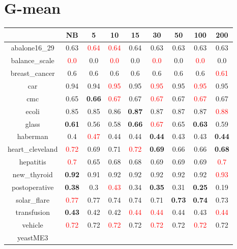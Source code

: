 \documentclass{article}%
\begin{document}
\section*{G{-}mean}%
\begin{tabular}{c|cccccccc}%
\hline%
&NB&5&10&15&30&50&100&200\\%
\hline%
abalone16\_29&0.63&\textcolor{red}{ 
0.64
}&\textcolor{red}{ 
0.64
}&0.64&0.63&0.63&0.63&0.63\\%
\hline%
balance\_scale&\textcolor{red}{ 
0.0
}&0.0&\textcolor{red}{ 
0.0
}&0.0&\textcolor{red}{ 
0.0
}&0.0&\textcolor{red}{ 
0.0
}&0.0\\%
\hline%
breast\_cancer&0.6&0.6&0.6&0.6&0.6&0.6&0.6&\textcolor{red}{ 
0.61
}\\%
\hline%
car&0.94&0.94&\textcolor{red}{ 
0.95
}&0.95&\textcolor{red}{ 
0.95
}&0.95&\textcolor{red}{ 
0.95
}&0.95\\%
\hline%
cmc&0.65&\textbf{0.66}&\textcolor{red}{ 
0.67
}&0.67&\textcolor{red}{ 
0.67
}&0.67&\textcolor{red}{ 
0.67
}&0.67\\%
\hline%
ecoli&0.85&0.85&0.86&\textbf{0.87}&0.87&0.87&0.87&\textcolor{red}{ 
0.88
}\\%
\hline%
glass&\textbf{0.61}&0.56&0.58&\textbf{0.66}&\textcolor{red}{ 
0.67
}&0.65&\textbf{0.63}&0.59\\%
\hline%
haberman&0.4&\textcolor{red}{ 
0.47
}&0.44&0.44&\textbf{0.44}&0.43&0.43&\textbf{0.44}\\%
\hline%
heart\_cleveland&\textcolor{red}{ 
0.72
}&0.69&0.71&\textcolor{red}{ 
0.72
}&\textbf{0.69}&0.66&0.66&\textbf{0.68}\\%
\hline%
hepatitis&\textcolor{red}{ 
0.7
}&0.65&0.68&0.68&0.69&0.69&0.69&\textcolor{red}{ 
0.7
}\\%
\hline%
new\_thyroid&\textbf{0.92}&0.91&0.92&0.92&0.92&0.92&0.92&\textcolor{red}{ 
0.93
}\\%
\hline%
postoperative&\textbf{0.38}&0.3&\textcolor{red}{ 
0.43
}&0.34&\textbf{0.35}&0.31&\textbf{0.25}&0.19\\%
\hline%
solar\_flare&\textcolor{red}{ 
0.77
}&0.77&0.74&0.74&0.71&\textbf{0.73}&\textbf{0.74}&0.73\\%
\hline%
transfusion&\textbf{0.43}&0.42&0.42&\textcolor{red}{ 
0.44
}&\textcolor{red}{ 
0.44
}&0.44&0.43&\textcolor{red}{ 
0.44
}\\%
\hline%
vehicle&\textcolor{red}{ 
0.72
}&0.72&\textcolor{red}{ 
0.72
}&0.72&\textcolor{red}{ 
0.72
}&0.72&\textcolor{red}{ 
0.72
}&0.72\\%
\hline%
yeastME3&\textcolor{red}{ 
}
\end{tabular}
\end{document}
